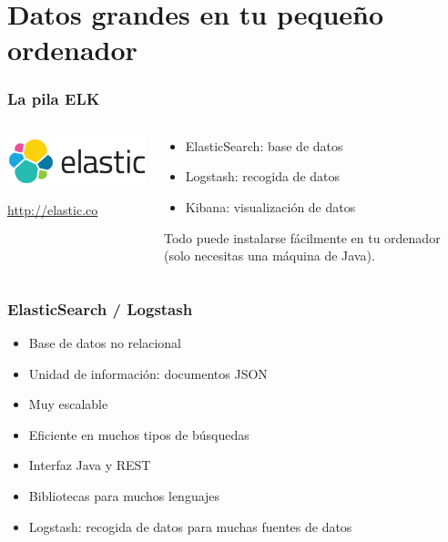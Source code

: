 %
%

\section{Datos grandes en tu pequeño ordenador}

\begin{frame}
\frametitle{La pila ELK}

\begin{columns}[T]
\begin{column}{.48\textwidth}
\includegraphics[width=6.5cm]{figs/elastic-logo}

\begin{flushright}
  {\Large
    \url{http://elastic.co}
  }
\end{flushright}

\end{column}%
\hfill%
\begin{column}{.50\textwidth}
{\Large
\begin{itemize}
\item ElasticSearch: base de datos
\item Logstash: recogida de datos
\item Kibana: visualización de datos
\end{itemize}

Todo puede instalarse fácilmente en tu ordenador (solo necesitas una máquina de Java).
}
\end{column}%
\end{columns}

\end{frame}

\begin{frame}
\frametitle{ElasticSearch / Logstash}

{\Large
  \begin{itemize}
  \item Base de datos no relacional
  \item Unidad de información: documentos JSON
  \item Muy escalable
  \item Eficiente en muchos tipos de búsquedas
  \item Interfaz Java y REST
  \item Bibliotecas para muchos lenguajes
  \item Logstash: recogida de datos para muchas fuentes de datos
  \end{itemize}
}

\end{frame}

